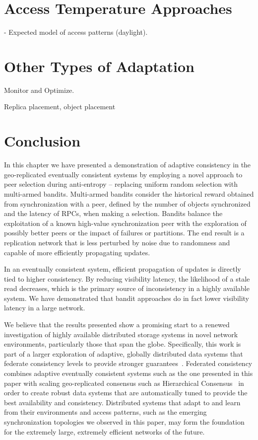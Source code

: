 \section{Access Temperature Approaches}


- Expected model of access patterns (daylight).

\section{Other Types of Adaptation}


Monitor and Optimize.

Replica placement, object placement


\section{Conclusion}

In this chapter we have presented a demonstration of adaptive consistency in
the geo-replicated eventually consistent systems by employing a novel
approach to peer selection during anti-entropy -- replacing uniform random
selection with multi-armed bandits.
Multi-armed bandits consider the historical reward obtained from
synchronization with a peer, defined by the number of objects synchronized
and the latency of RPCs, when making a selection.
Bandits balance the exploitation of a known high-value synchronization
peer with the exploration of possibly better peers or the impact of
failures or partitions.
The end result is a replication network that is less perturbed by noise
due to randomness and capable of more efficiently propagating updates.

In an eventually consistent system, efficient propagation of updates is
directly tied to higher consistency.
By reducing visibility latency, the likelihood of a stale read decreases,
which is the primary source of inconsistency in a highly available system.
We have demonstrated that bandit approaches do in fact lower visibility
latency in a large network.

We believe that the results presented show a promising start to a renewed
investigation of highly available distributed storage systems in novel
network environments, particularly those that span the globe.
Specifically, this work is part of a larger exploration of adaptive,
globally distributed data systems that federate consistency levels to provide
stronger guarantees~\cite{federated_consistency_poster}.
Federated consistency combines adaptive eventually consistent systems such as
the one presented in this paper with scaling geo-replicated consensus such as
Hierarchical Consensus~\cite{hc_brief_announcement} in order to create robust
data systems that are automatically tuned to provide the best availability
and consistency.
Distributed systems that adapt to and learn from their environments and
access patterns, such as the emerging synchronization topologies we observed
in this paper, may form the foundation for the extremely large, extremely
efficient networks of the future.
